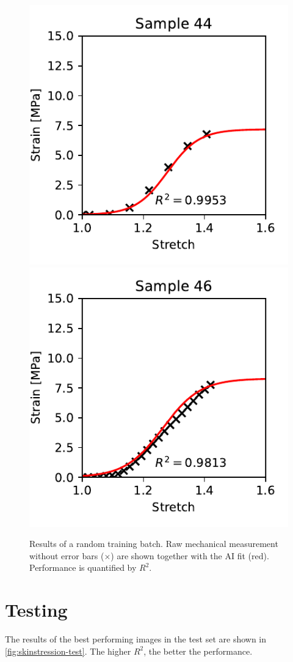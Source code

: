 \begin{figure}
    \includegraphics[width=0.24\linewidth]{skinstression/images/training/sample_44_1.pdf}
    \includegraphics[width=0.24\linewidth]{skinstression/images/training/sample_46_0.pdf}
    \caption[Training results]{
        Results of a random training batch.
        Raw mechanical measurement without error bars ($\times$) are shown together with the AI fit (red).
        Performance is quantified by $R^2$.
    }
    \label{fig:skinstression-train-logistic-curves}
\end{figure}

\section{Testing}
The results of the best performing images in the test set are shown in \cref{fig:skinstression-test}.
The higher $R^2$, the better the performance.


